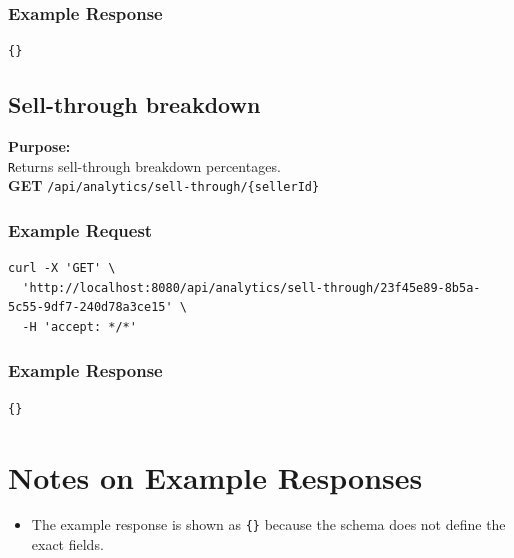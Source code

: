 \documentclass[a4paper,11pt]{article}
\begin{document}
\subsubsection*{Example Response}
\begin{lstlisting}
{}
\end{lstlisting}

\subsection{Sell-through breakdown}
\textbf{Purpose:} \\ \texttt Returns sell-through breakdown percentages. \\

\textbf{GET} \texttt{/api/analytics/sell-through/\{sellerId\}}

\subsubsection*{Example Request}
\begin{lstlisting}
curl -X 'GET' \
  'http://localhost:8080/api/analytics/sell-through/23f45e89-8b5a-5c55-9df7-240d78a3ce15' \
  -H 'accept: */*'
\end{lstlisting}

\subsubsection*{Example Response}
\begin{lstlisting}
{}
\end{lstlisting}

\section{Notes on Example Responses}
\begin{itemize}[leftmargin=1.2em]
  \item The example response is shown as \texttt{\{\}} because the schema does not define the exact fields.

\end{itemize}
\end{document}
